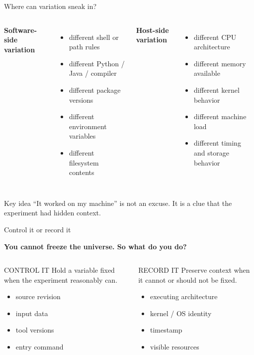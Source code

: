 \documentclass[aspectratio=169,11pt]{beamer}
\newcommand{\bigquestion}[1]{%
  \begin{center}
  \vspace{0.15em}
  {\Large\bfseries\color{DeepNavy}#1}
  \end{center}
}
\begin{document}
\begin{frame}{Where can variation sneak in?}
\begin{columns}[T,onlytextwidth]
\textbf{Software-side variation}
\begin{itemize}
  \item different shell or path rules
  \item different Python / Java / compiler
  \item different package versions
  \item different environment variables
  \item different filesystem contents
\end{itemize}

\textbf{Host-side variation}
\begin{itemize}
  \item different CPU architecture
  \item different memory available
  \item different kernel behavior
  \item different machine load
  \item different timing and storage behavior
\end{itemize}
\end{columns}

\begin{exampleblock}{Key idea}
``It worked on my machine'' is not an excuse. It is a clue that the experiment had hidden context.
\end{exampleblock}
\end{frame}

\begin{frame}{Control it or record it}
\bigquestion{You cannot freeze the universe. So what do you do?}

\begin{columns}[T,onlytextwidth]
\begin{block}{CONTROL IT}
Hold a variable fixed when the experiment reasonably can.
\begin{itemize}
  \item source revision
  \item input data
  \item tool versions
  \item entry command
\end{itemize}
\end{block}

\begin{exampleblock}{RECORD IT}
Preserve context when it cannot or should not be fixed.
\begin{itemize}
  \item executing architecture
  \item kernel / OS identity
  \item timestamp
  \item visible resources
\end{itemize}
\end{exampleblock}
\end{columns}
\end{frame}
\end{document}

